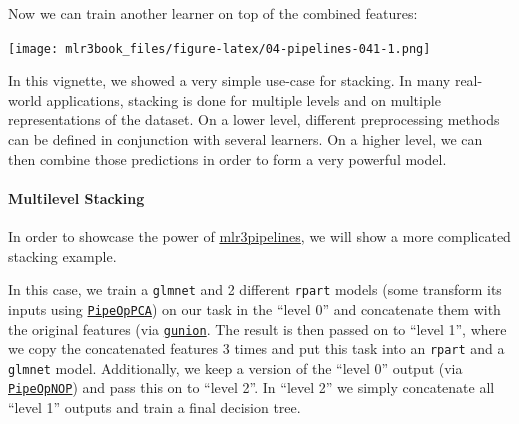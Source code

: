 \documentclass[]{article}
\newenvironment{Shaded}{\begin{snugshade}}{\end{snugshade}}
\newcommand{\CommentTok}[1]{\textcolor[rgb]{0.56,0.35,0.01}{\textit{#1}}}
\newcommand{\DataTypeTok}[1]{\textcolor[rgb]{0.13,0.29,0.53}{#1}}
\newcommand{\KeywordTok}[1]{\textcolor[rgb]{0.13,0.29,0.53}{\textbf{#1}}}
\newcommand{\NormalTok}[1]{#1}
\newcommand{\OperatorTok}[1]{\textcolor[rgb]{0.81,0.36,0.00}{\textbf{#1}}}
\newcommand{\OtherTok}[1]{\textcolor[rgb]{0.56,0.35,0.01}{#1}}
\newcommand{\StringTok}[1]{\textcolor[rgb]{0.31,0.60,0.02}{#1}}
\let\oldparagraph\paragraph
\renewcommand{\paragraph}[1]{\oldparagraph{#1}\mbox{}}
\renewenvironment{Shaded} {\begin{snugshade}\small} {\end{snugshade}}
\begin{document}
Now we can train another learner on top of the combined features:

\begin{Shaded}
\end{Shaded}

\texttt{[image: mlr3book\_files/figure-latex/04-pipelines-041-1.png]}

\begin{Shaded}
\end{Shaded}

In this vignette, we showed a very simple use-case for stacking.
In many real-world applications, stacking is done for multiple levels and on multiple representations of the dataset.
On a lower level, different preprocessing methods can be defined in conjunction with several learners.
On a higher level, we can then combine those predictions in order to form a very powerful model.

\hypertarget{multilevel-stacking}{%
\paragraph{Multilevel Stacking}\label{multilevel-stacking}}

In order to showcase the power of \href{https://mlr3pipelines.mlr-org.com}{mlr3pipelines}, we will show a more complicated stacking example.

In this case, we train a \texttt{glmnet} and 2 different \texttt{rpart} models (some transform its inputs using \href{https://mlr3pipelines.mlr-org.com/reference/mlr_pipeops_pca.html}{\texttt{PipeOpPCA}}) on our task in the ``level 0'' and concatenate them with the original features (via \href{https://mlr3pipelines.mlr-org.com/reference/gunion.html}{\texttt{gunion}}.
The result is then passed on to ``level 1'', where we copy the concatenated features 3 times and put this task into an \texttt{rpart} and a \texttt{glmnet} model.
Additionally, we keep a version of the ``level 0'' output (via \href{https://mlr3pipelines.mlr-org.com/reference/mlr_pipeops_nop.html}{\texttt{PipeOpNOP}}) and pass this on to ``level 2''.
In ``level 2'' we simply concatenate all ``level 1'' outputs and train a final decision tree.
\end{document}
